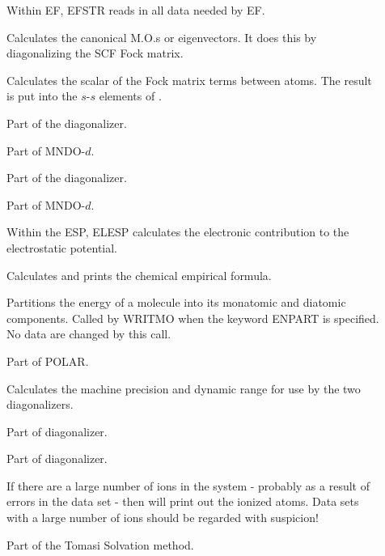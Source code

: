 \begin{description}
\item[] Within EF, EFSTR reads in all data needed by EF.

\item[] Calculates the canonical M.O.s or eigenvectors.  It 
does this by diagonalizing the SCF Fock matrix.

\item[] Calculates the scalar of the Fock matrix terms between
atoms. The result is put into the $s$-$s$ elements of .

\item[] Part of the diagonalizer.

\item[] Part of MNDO-$d$.

\item[] Part of the diagonalizer.

\item[] Part of MNDO-$d$.

\item[] Within the ESP, ELESP calculates the electronic 
contribution to the electrostatic potential.

\item[] Calculates and prints the chemical empirical formula.

\item[] Partitions the energy of a molecule into its monatomic and
diatomic components. Called by WRITMO when the keyword  ENPART is specified. No
data are changed by this call.

\item[] Part of POLAR.

\item[] Calculates the machine precision and dynamic range for use
by the two diagonalizers.

\item[] Part of diagonalizer.

\item[] Part of diagonalizer.

\item[] If there are a large number of ions in the system -
probably as a result of errors in the data set - then  will print
out the ionized atoms.   Data sets with a large number of ions should be
regarded with suspicion!

\item[] Part of the Tomasi Solvation method.


\end{description}
